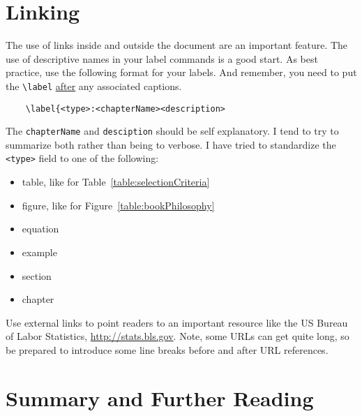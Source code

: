 \lipsum[13]

\section{Linking}
\label{section:howToLinking}
The use of links inside and outside the document are an important feature.  The use
of descriptive names in your label commands is a good start.  As best practice, use
the following format for your labels.  And remember, you need to put the 
\verb+\label+ \ul{after} any associated captions.

\begin{verbatim}
	\label{<type>:<chapterName><description>
\end{verbatim}

The \verb+chapterName+ and \verb+desciption+ should be self explanatory.  I tend to 
try to summarize both rather than being to verbose.  I have tried to standardize the 
\verb+<type>+ field to one of the following:
\begin{itemize}
\item  table, like for Table~\ref{table:selectionCriteria}
\item  figure, like for Figure~\ref{table:bookPhilosophy}
\item equation
\item example
\item section
\item chapter
\end{itemize}

Use external links to point readers to an important resource like the US Bureau of Labor Statistics, 
\url{http://stats.bls.gov}. Note, some URLs can get quite long, so be prepared to introduce some line 
breaks before and after URL references.

\section{Summary and Further Reading}
\label{section:summary-and-further-reading}

\lipsum[30-31]
